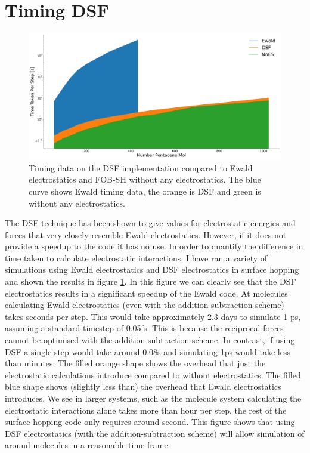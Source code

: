 \section{Timing DSF}
\begin{figure}[htp]
  \includegraphics[width=\textwidth]{../img/ES/SH_timing_wEwald.png}
  \caption{\label{fig:DSF_Timings}Timing data on the DSF implementation compared to Ewald electrostatics and FOB-SH without any electrostatics. The blue curve shows Ewald timing data, the orange is DSF and green is without any electrostatics.}
\end{figure}
\noindent The DSF technique has been shown to give values for electrostatic energies and forces that very closely resemble Ewald electrostatics. However, if it does not provide a speedup to the code it has no use. In order to quantify the difference in time taken to calculate electrostatic interactions, I have ran a variety of simulations using Ewald electrostatics and DSF electrostatics in surface hopping and shown the results in figure \ref{fig:DSF_Timings}. In this figure we can clearly see that the DSF electrostatics results in a significant speedup of the Ewald code. At  molecules calculating Ewald electrostatics (even with the addition-subtraction scheme) takes  seconds per step. This would take approximately 2.3 days to simulate 1 ps, assuming a standard timestep of 0.05fs. This is because the reciprocal forces  cannot be optimised with the addition-subtraction scheme. In contrast, if using DSF a single step would take around 0.08s and simulating 1ps would take less than  minutes. The filled orange shape shows the overhead that just the electrostatic calculations introduce compared to without electrostatics. The filled blue shape shows (slightly less than) the overhead that Ewald electrostatics introduces. We see in larger systems, such as the  molecule system calculating the electrostatic interactions alone takes more than  hour per step, the rest of the surface hopping code only requires around  second. This figure shows that using DSF electrostatics (with the addition-subtraction scheme) will allow simulation of around  molecules in a reasonable time-frame.


